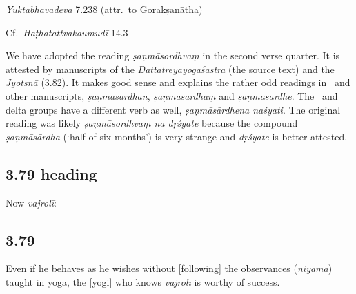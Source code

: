 \begin{ekdosis}
\begin{testimonia}[hp03_078]
\emph{Yuktabhavadeva} 7.238 (attr.~to Gorakṣanātha)
\begin{versinnote}
\end{versinnote}

Cf.~\emph{Haṭhatattvakaumudī} 14.3
 \begin{versinnote}
\end{versinnote}
\end{testimonia}

\begin{philcomm}[hp03_078]
We have adopted the reading \emph{ṣaṇmāsordhvaṃ} in the second verse quarter. It is attested by manuscripts of the \emph{Dattātreyayogaśāstra} (the source text) and the \emph{Jyotsnā} (3.82). It makes good sense and explains the rather odd readings in \textalpha\ and other manuscripts, \emph{ṣaṇmāsārdhān}, \emph{ṣaṇmāsārdhaṃ} and \emph{ṣaṇmāsārdhe}. The \textgamma\ and delta groups have a different verb as well, \emph{ṣaṇmāsārdhena naśyati}. The original reading was likely \emph{ṣaṇmāsordhvaṃ na dṛśyate} because the compound \emph{ṣaṇmāsārdha} (`half of six months') is very strange and \emph{dṛśyate} is better attested.

\end{philcomm}


\subsection*{3.79 heading}
\begin{translation}[hp03_079a]
Now \emph{vajrolī}:
\end{translation}


\subsection*{3.79}
\begin{translation}[hp03_079]
Even if he behaves as he wishes without [following] the observances (\emph{niyama}) taught in yoga, the [yogi] who knows \emph{vajrolī} is worthy of success.
\end{translation}


\end{ekdosis}
